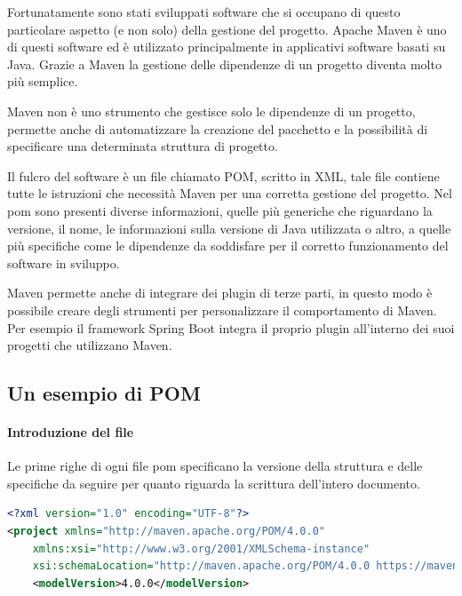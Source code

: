 Fortunatamente sono stati sviluppati software che si occupano di questo particolare aspetto (e non solo) della gestione del progetto. Apache Maven è uno di questi software ed è utilizzato principalmente in applicativi software basati su Java. Grazie a Maven la gestione delle dipendenze di un progetto diventa molto più semplice.

Maven non è uno strumento che gestisce solo le dipendenze di un progetto, permette anche di automatizzare la creazione del pacchetto e la possibilità di specificare una determinata struttura di progetto.

Il fulcro del software è un file chiamato \ac{POM}, scritto in \ac{XML}, tale file contiene tutte le istruzioni che necessità Maven per una corretta gestione del progetto. Nel pom sono presenti diverse informazioni, quelle più generiche che riguardano la versione, il nome, le informazioni sulla versione di Java utilizzata o altro, a quelle più specifiche come le dipendenze da soddisfare per il corretto funzionamento del software in sviluppo.

Maven permette anche di integrare dei plugin di terze parti, in questo modo è possibile creare degli strumenti per personalizzare il comportamento di Maven. Per esempio il framework Spring Boot integra il proprio plugin all'interno dei suoi progetti che utilizzano Maven.

\subsection{Un esempio di POM}

\paragraph{Introduzione del file}
Le prime righe di ogni file pom specificano la  versione della struttura e delle specifiche da seguire per quanto riguarda la scrittura dell'intero documento.
\begin{lstlisting}[language=XML, caption=Introduzione del POM]
<?xml version="1.0" encoding="UTF-8"?>
<project xmlns="http://maven.apache.org/POM/4.0.0"
	xmlns:xsi="http://www.w3.org/2001/XMLSchema-instance"
	xsi:schemaLocation="http://maven.apache.org/POM/4.0.0 https://maven.apache.org/xsd/maven-4.0.0.xsd">
	<modelVersion>4.0.0</modelVersion>
\end{lstlisting}



